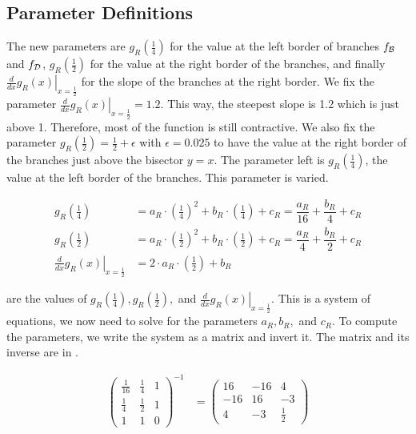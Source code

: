 \subsection{Parameter Definitions}

The new parameters are $g_R\left(\frac{1}{4}\right)$ for the value at the left border of branches $f_{\mathcal{B}}$ and $f_{\mathcal{D}}$, $g_R\left(\frac{1}{2}\right)$ for the value at the right border of the branches, and finally $\left. \frac{d}{dx} g_R(x) \right|_{x = \frac{1}{2}}$ for the slope of the branches at the right border.
We fix the parameter $\left. \frac{d}{dx} g_R(x) \right|_{x = \frac{1}{2}} = 1.2$.
This way, the steepest slope is 1.2 which is just above 1.
Therefore, most of the function is still contractive.
We also fix the parameter $g_R\left(\frac{1}{2}\right) = \frac{1}{2} + \epsilon$ with $\epsilon = 0.025$ to have the value at the right border of the branches just above the bisector $y = x$.
The parameter left is $g_R\left(\frac{1}{4}\right)$, the value at the left border of the branches.
This parameter is varied.

\begin{subequations}
	\begin{align}
		g_R\left(\frac{1}{4}\right)                                     & = a_R \cdot \left(\frac{1}{4}\right)^2 + b_R \cdot \left(\frac{1}{4}\right) + c_R = \dfrac{a_R}{16} + \dfrac{b_R}{4} + c_R \label{equ:setup.quad.hyper.A} \\
		g_R\left(\frac{1}{2}\right)                                     & = a_R \cdot \left(\frac{1}{2}\right)^2 + b_R \cdot \left(\frac{1}{2}\right) + c_R = \dfrac{a_R}{4} + \dfrac{b_R}{2} + c_R \label{equ:setup.quad.hyper.B}  \\
		\left. \frac{d}{dx} g_R\left(x\right) \right|_{x = \frac{1}{2}} & = 2 \cdot a_R \cdot \left(\frac{1}{2}\right) + b_R \label{equ:setup.quad.hyper.C}
	\end{align}
\end{subequations}

 are the values of $g_R\left(\frac{1}{4}\right), g_R\left(\frac{1}{2}\right),$ and $\left. \frac{d}{dx} g_R\left(x\right) \right|_{x = \frac{1}{2}}$.
This is a system of equations, we now need to solve for the parameters $a_R, b_R,$ and $c_R$.
To compute the parameters, we write the system as a matrix and invert it.
The matrix and its inverse are in .

\begin{align}
	\begin{pmatrix}
		\frac{1}{16} & \frac{1}{4} & 1 \\
		\frac{1}{4}  & \frac{1}{2} & 1 \\
		1            & 1           & 0
	\end{pmatrix}^{-1} & =
	\begin{pmatrix}
		16  & -16 & 4           \\
		-16 & 16  & -3          \\
		4   & -3  & \frac{1}{2}
	\end{pmatrix}
	\label{equ:setup.quad.hyper.matrix}
\end{align}

